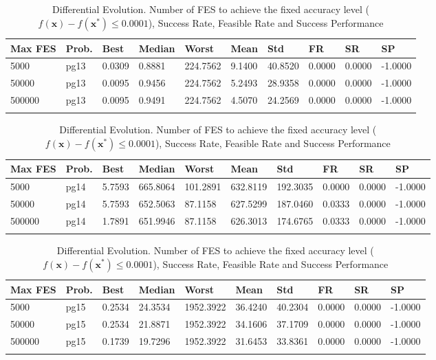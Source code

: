 \documentclass[10pt, a4paper]{book}
\begin{document}
\begin{center}
\begin{longtable}{l l l l l l l l l l}
\textbf{Max FES} & \textbf{Prob.} & \textbf{Best} & \textbf{Median} & \textbf{Worst} & \textbf{Mean} & \textbf{Std} & \textbf{FR} & \textbf{SR} & \textbf{SP} \\
\hline
5000 & pg13 & 0.0309 & 0.8881 & 224.7562 & 9.1400 & 40.8520 & 0.0000 & 0.0000 & -1.0000 \\
50000 & pg13 & 0.0095 & 0.9456 & 224.7562 & 5.2493 & 28.9358 & 0.0000 & 0.0000 & -1.0000 \\
500000 & pg13 & 0.0095 & 0.9491 & 224.7562 & 4.5070 & 24.2569 & 0.0000 & 0.0000 & -1.0000 \\

\caption{ Differential Evolution. Number of FES to achieve the fixed accuracy level ($f(\mathbf{x}) - f(\mathbf{x}^{*}) \leq 0.0001$), Success Rate, Feasible Rate and Success Performance }
\end{longtable}
\end{center}

\begin{center}
\begin{longtable}{l l l l l l l l l l}
\textbf{Max FES} & \textbf{Prob.} & \textbf{Best} & \textbf{Median} & \textbf{Worst} & \textbf{Mean} & \textbf{Std} & \textbf{FR} & \textbf{SR} & \textbf{SP} \\
\hline
5000 & pg14 & 5.7593 & 665.8064 & 101.2891 & 632.8119 & 192.3035 & 0.0000 & 0.0000 & -1.0000 \\
50000 & pg14 & 5.7593 & 652.5063 & 87.1158 & 627.5299 & 187.0460 & 0.0333 & 0.0000 & -1.0000 \\
500000 & pg14 & 1.7891 & 651.9946 & 87.1158 & 626.3013 & 174.6765 & 0.0333 & 0.0000 & -1.0000 \\

\caption{ Differential Evolution. Number of FES to achieve the fixed accuracy level ($f(\mathbf{x}) - f(\mathbf{x}^{*}) \leq 0.0001$), Success Rate, Feasible Rate and Success Performance }
\end{longtable}
\end{center}

\begin{center}
\begin{longtable}{l l l l l l l l l l}
\textbf{Max FES} & \textbf{Prob.} & \textbf{Best} & \textbf{Median} & \textbf{Worst} & \textbf{Mean} & \textbf{Std} & \textbf{FR} & \textbf{SR} & \textbf{SP} \\
\hline
5000 & pg15 & 0.2534 & 24.3534 & 1952.3922 & 36.4240 & 40.2304 & 0.0000 & 0.0000 & -1.0000 \\
50000 & pg15 & 0.2534 & 21.8871 & 1952.3922 & 34.1606 & 37.1709 & 0.0000 & 0.0000 & -1.0000 \\
500000 & pg15 & 0.1739 & 19.7296 & 1952.3922 & 31.6453 & 33.8361 & 0.0000 & 0.0000 & -1.0000 \\

\caption{ Differential Evolution. Number of FES to achieve the fixed accuracy level ($f(\mathbf{x}) - f(\mathbf{x}^{*}) \leq 0.0001$), Success Rate, Feasible Rate and Success Performance }
\end{longtable}
\end{center}
\end{document}
